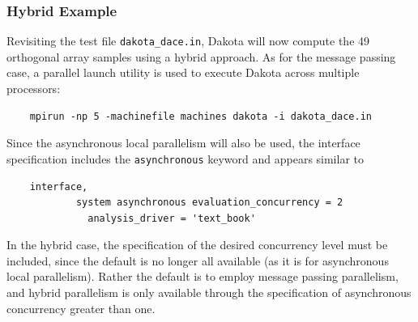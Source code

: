 \subsubsection{Hybrid Example}\label{parallel:SLP:hybrid:ex}

Revisiting the test file \texttt{dakota\_dace.in}, Dakota will now
compute the 49 orthogonal array samples using a hybrid approach.  As
for the message passing case, a parallel launch utility is used to
execute Dakota across multiple processors:
\begin{small}
\begin{verbatim}
    mpirun -np 5 -machinefile machines dakota -i dakota_dace.in
\end{verbatim}
\end{small}

Since the asynchronous local parallelism will also be used, the
interface specification includes the \texttt{asynchronous}
keyword and appears similar to
\begin{small}
\begin{verbatim}
    interface,
            system asynchronous evaluation_concurrency = 2
              analysis_driver = 'text_book'
\end{verbatim}
\end{small}
In the hybrid case, the specification of the desired concurrency level
must be included, since the default is no longer all available (as it
is for asynchronous local parallelism).  Rather the default is to employ
message passing parallelism, and hybrid parallelism is only available
through the specification of asynchronous concurrency greater than one.


